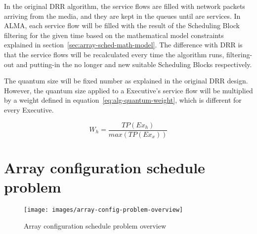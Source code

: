In the original DRR algorithm, the service flows are filled with network packets arriving from the media, and they are kept in the queues until are services. In ALMA, each service flow will be filled with the result of the Scheduling Block filtering for the given time based on the mathematical model constraints explained in section~\ref{sec:array-sched-math-model}. The difference with DRR is that the service flows will be recalculated every time the algorithm runs, filtering-out and putting-in the no longer and new suitable Scheduling Blocks respectively.

The quantum size will be fixed number as explained in the original DRR design. However, the quantum size applied to a Executive's service flow will be multiplied by a weight defined in equation~\ref{eq:alg-quantum-weight}, which is different for every Executive.

\begin{equation}
\label{eq:alg-quantum-weight}
W_{h} = \frac{TP(Ex_h)}{max(TP(Ex_x))}
\end{equation}


\section{Array configuration schedule problem}
\begin{figure}[h!]
\begin{center}
\texttt{[image: images/array-config-problem-overview]}
\caption{Array configuration schedule problem overview}
\end{center}
\label{fig:array-config-problem-overview}
\end{figure}
